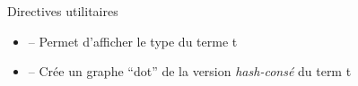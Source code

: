 \begin{frame}{Directives utilitaires}

  \begin{itemize}
  \item {} -- Permet d'afficher le type du terme t
  \bigskip

  \item {} -- Crée un graphe ``dot'' de la version \emph{hash-consé} du term t
  \end{itemize}

\end{frame}
